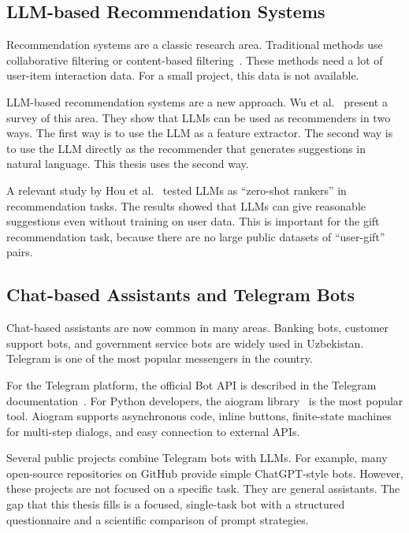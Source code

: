 \subsection{LLM-based Recommendation Systems}

Recommendation systems are a classic research area. Traditional methods use collaborative filtering or content-based filtering~\cite{ricci2015recommender}. These methods need a lot of user-item interaction data. For a small project, this data is not available.

LLM-based recommendation systems are a new approach. Wu et al.~\cite{wu2024survey} present a survey of this area. They show that LLMs can be used as recommenders in two ways. The first way is to use the LLM as a feature extractor. The second way is to use the LLM directly as the recommender that generates suggestions in natural language. This thesis uses the second way.

A relevant study by Hou et al.~\cite{hou2024large} tested LLMs as ``zero-shot rankers'' in recommendation tasks. The results showed that LLMs can give reasonable suggestions even without training on user data. This is important for the gift recommendation task, because there are no large public datasets of ``user-gift'' pairs.

\subsection{Chat-based Assistants and Telegram Bots}

Chat-based assistants are now common in many areas. Banking bots, customer support bots, and government service bots are widely used in Uzbekistan. Telegram is one of the most popular messengers in the country.

For the Telegram platform, the official Bot API is described in the Telegram documentation~\cite{telegram_botapi}. For Python developers, the aiogram library~\cite{aiogram_docs} is the most popular tool. Aiogram supports asynchronous code, inline buttons, finite-state machines for multi-step dialogs, and easy connection to external APIs.

Several public projects combine Telegram bots with LLMs. For example, many open-source repositories on GitHub provide simple ChatGPT-style bots. However, these projects are not focused on a specific task. They are general assistants. The gap that this thesis fills is a focused, single-task bot with a structured questionnaire and a scientific comparison of prompt strategies.

